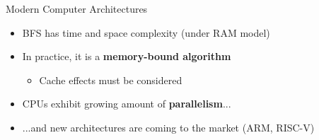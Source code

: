 \begin{frame}{Modern Computer Architectures}
\begin{itemize}
    \item BFS has  time and space complexity (under RAM model)
    \item<2-> In practice, it is a \textbf{memory-bound algorithm} %
    \begin{itemize}
        \item Cache effects must be considered
    \end{itemize}
    \item<3-> CPUs exhibit growing amount of \textbf{parallelism}...
    \item<4-> ...and new architectures are coming to the market (ARM, RISC-V)
\end{itemize}
\end{frame}

